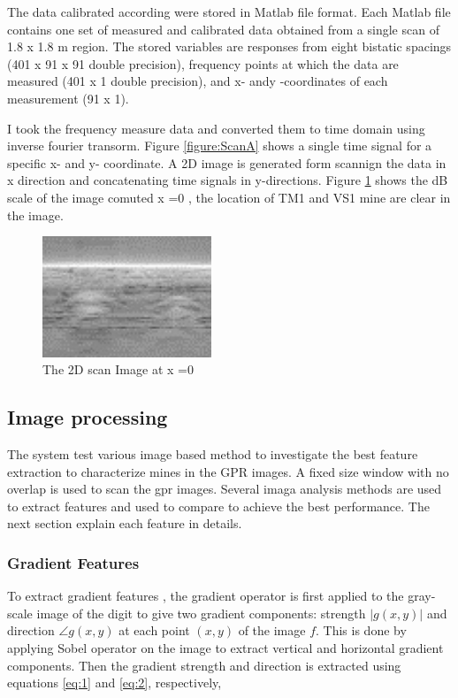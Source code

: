 \documentclass[conference]{IEEEtran}
\begin{document}
The data calibrated according were stored in Matlab file format. Each Matlab file contains one set of measured and calibrated data obtained from a single scan of 1.8 x 1.8 m region. The stored variables are responses from eight bistatic spacings (401 x 91 x 91 double precision), frequency points at which the data are measured (401 x 1 double precision), and x- andy -coordinates of each measurement (91 x 1).



I took the frequency measure data and converted them to time domain using inverse fourier transorm. Figure \ref{figure:ScanA} shows a single time signal for a specific x- and y- coordinate. A 2D image is generated form scannign the data in x direction and concatenating time signals in y-directions. Figure \ref{fig:mineAtx0} shows the dB scale of the image comuted x =0 , the location of TM1 and VS1 mine are clear in the image. %








 \begin{figure}
\centering
\label{fig:mineAtx0}
\includegraphics[width=0.45\textwidth]{images/MineCleanX0.jpg}
 \caption{The 2D scan Image at x =0 }
\end{figure}

\subsection{Image processing}

The system test various image based method to investigate the best feature extraction to characterize mines in the GPR images. A fixed size window with no overlap is used to scan the gpr images. Several imaga analysis methods are used to extract features and used to compare to achieve the best performance. The next section explain each feature in details.

\subsubsection {Gradient Features}
\label{sec:grad}
To extract gradient features \cite{Liu2003}, the gradient operator is first applied to the gray-scale image of the digit to give two gradient components: strength $|g(x,y)|$ and direction $\angle g(x,y)$ at each point $(x,y)$ of the image $f$. This is done by applying Sobel operator \cite{gonzales2002} on the image to extract vertical and horizontal gradient components. Then the gradient strength and direction is extracted using equations \ref{eq:1} and  \ref{eq:2}, respectively,
\end{document}
